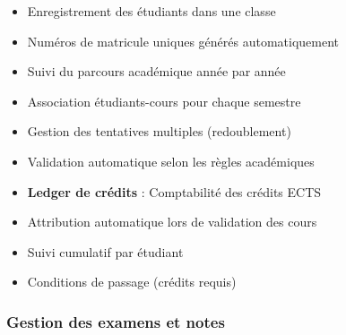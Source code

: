 \begin{description}[leftmargin=3cm, style=nextline]
    \item[Inscriptions]
    \begin{itemize}
        \item Enregistrement des étudiants dans une classe
        \item Numéros de matricule uniques générés automatiquement
        \item Suivi du parcours académique année par année
    \end{itemize}

    \item[Inscriptions aux cours]
    \begin{itemize}
        \item Association étudiants-cours pour chaque semestre
        \item Gestion des tentatives multiples (redoublement)
        \item Validation automatique selon les règles académiques
    \end{itemize}

    \item[Système de crédits]
    \begin{itemize}
        \item \textbf{Ledger de crédits} : Comptabilité des crédits ECTS
        \item Attribution automatique lors de validation des cours
        \item Suivi cumulatif par étudiant
        \item Conditions de passage (crédits requis)
    \end{itemize}
\end{description}

\subsubsection{Gestion des examens et notes}

